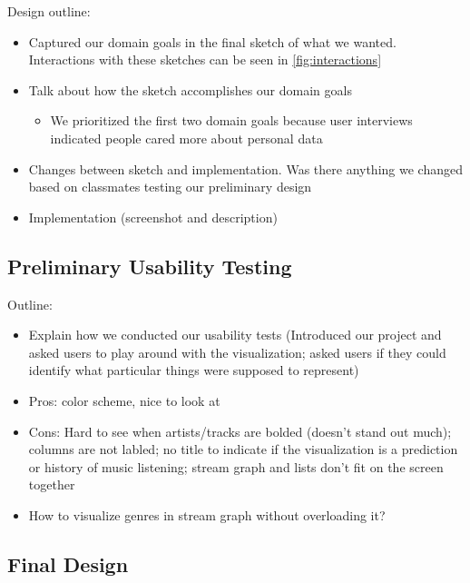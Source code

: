 \documentclass[journal]{vgtc}                %
\begin{document}
Design outline:
\begin{itemize}
  \item Captured our domain goals in the final sketch of what we wanted. Interactions with these sketches can be seen in \autoref{fig:interactions}
  \item Talk about how the sketch accomplishes our domain goals
  \begin{itemize}
    \item We prioritized the first two domain goals because user interviews indicated people cared more about personal data
  \end{itemize}
  \item Changes between sketch and implementation. Was there anything we changed based on classmates testing our preliminary design
  \item Implementation (screenshot and description)
\end{itemize}

\subsection{Preliminary Usability Testing}
Outline:
\begin{itemize}
  \item Explain how we conducted our usability tests (Introduced our project and asked users to play around with the visualization; asked users if they could identify what particular things were supposed to represent)
  \item Pros: color scheme, nice to look at
  \item Cons: Hard to see when artists/tracks are bolded (doesn't stand out much); columns are not labled; no title to indicate if the visualization is a prediction or history of music listening; stream graph and lists don't fit on the screen together
  \item How to visualize genres in stream graph without overloading it?
\end{itemize}



\subsection{Final Design}
\end{document}
